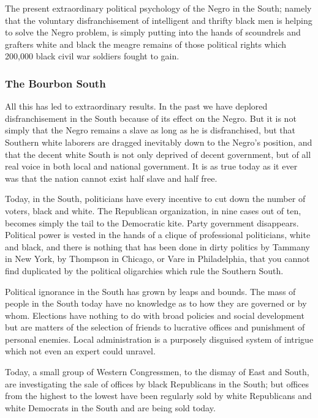 \documentclass[letterpaper,10pt,english]{jupyterBook}
\begin{document}
\sphinxAtStartPar
The present extraordinary political psychology of the Negro in the South; namely that the voluntary disfranchisement of intelligent and thrifty black men is helping to solve the Negro problem, is simply putting into the hands of scoundrels and grafters white and black the meagre remains of those political rights which 200,000 black civil war soldiers fought to gain.


\subsubsection{The Bourbon South}
\label{\detokenize{Volumes/36/05/negro_citizen:the-bourbon-south}}
\sphinxAtStartPar
All this has led to extraordinary results. In the past we have deplored disfranchisement in the South because of its effect on the Negro. But it is not simply that the Negro remains a slave as long as he is disfranchised, but that Southern white laborers are dragged inevitably down to the Negro’s position, and that the decent white South is not only deprived of decent government, but of all real voice in both local and national government. It is as true today as it ever was that the nation cannot exist half slave and half free.

\sphinxAtStartPar
Today, in the South, politicians have every incentive to cut down the number of voters, black and white. The Republican organization, in nine cases out of ten, becomes simply the tail to the Democratic kite. Party government disappears. Political power is vested in the hands of a clique of professional politicians, white and black, and there is nothing that has been done in dirty politics by Tammany in New York, by Thompson in Chicago, or Vare in Philadelphia, that you cannot find duplicated by the political oligarchies which rule the Southern South.

\sphinxAtStartPar
Political ignorance in the South has grown by leaps and bounds. The mass of people in the South today have no knowledge as to how they are governed or by whom. Elections have nothing to do with broad policies and social development but are matters of the selection of friends to lucrative offices and punishment of personal enemies. Local administration is a purposely disguised system of intrigue which not even an expert could unravel.

\sphinxAtStartPar
Today, a small group of Western Congressmen, to the dismay of East and South, are investigating the sale of offices by black Republicans in the South; but offices from the highest to the lowest have been regularly sold by white Republicans and white Democrats in the South and are being sold today.
\end{document}
